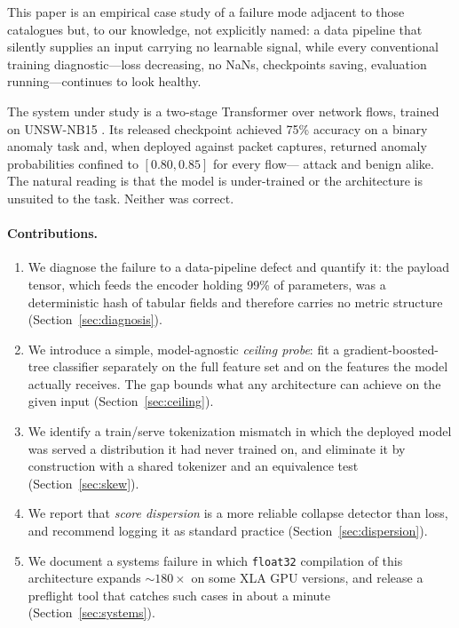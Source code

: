 \documentclass[11pt]{article}
\begin{document}
This paper is an empirical case study of a failure mode adjacent to those
catalogues but, to our knowledge, not explicitly named: a data pipeline that
silently supplies an input carrying no learnable signal, while every conventional
training diagnostic---loss decreasing, no NaNs, checkpoints saving, evaluation
running---continues to look healthy.

The system under study is a two-stage Transformer over network flows, trained on
UNSW-NB15 \citep{moustafa2015unsw}. Its released checkpoint achieved 75\%
accuracy on a binary anomaly task and, when deployed against packet captures,
returned anomaly probabilities confined to $[0.80, 0.85]$ for every flow---
attack and benign alike. The natural reading is that the model is
under-trained or the architecture is unsuited to the task. Neither was correct.

\paragraph{Contributions.}
\begin{enumerate}
  \item We diagnose the failure to a data-pipeline defect and quantify it: the
  payload tensor, which feeds the encoder holding 99\% of parameters, was a
  deterministic hash of tabular fields and therefore carries no metric structure
  (Section~\ref{sec:diagnosis}).
  \item We introduce a simple, model-agnostic \emph{ceiling probe}: fit a
  gradient-boosted-tree classifier separately on the full feature set and on the
  features the model actually receives. The gap bounds what any architecture can
  achieve on the given input (Section~\ref{sec:ceiling}).
  \item We identify a train/serve tokenization mismatch in which the deployed
  model was served a distribution it had never trained on, and eliminate it by
  construction with a shared tokenizer and an equivalence test
  (Section~\ref{sec:skew}).
  \item We report that \emph{score dispersion} is a more reliable collapse
  detector than loss, and recommend logging it as standard practice
  (Section~\ref{sec:dispersion}).
  \item We document a systems failure in which \texttt{float32} compilation of
  this architecture expands ${\sim}180\times$ on some XLA GPU versions, and
  release a preflight tool that catches such cases in about a minute
  (Section~\ref{sec:systems}).
\end{enumerate}
\end{document}
